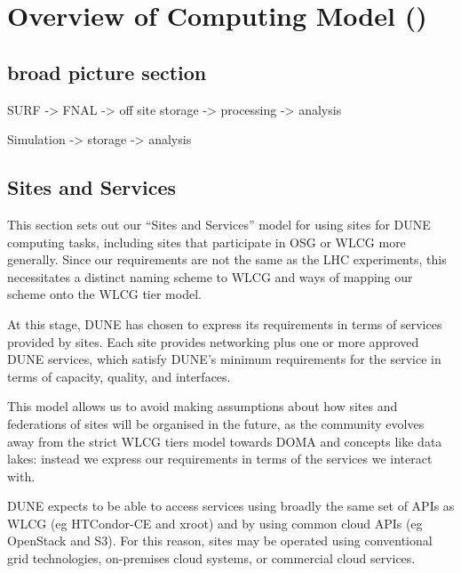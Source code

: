 \chapter{Overview of Computing Model ()}
\label{ch:cm}

\section{broad picture section}

SURF -> FNAL -> off site storage -> processing -> analysis

Simulation -> storage -> analysis



\section{Sites and Services}
\label{sec:cm:sites_and_services}  %


This section sets out our ``Sites and Services'' model for using sites for DUNE computing tasks, including sites that participate in OSG or WLCG more generally. Since our requirements are not the same as the LHC experiments, this necessitates a distinct naming scheme to WLCG and ways of mapping our scheme onto the WLCG tier model.

At this stage, DUNE has chosen to express its requirements in terms of services provided by sites. Each site provides networking plus one or more approved DUNE services, which satisfy DUNE's minimum requirements for the service in terms of capacity, quality, and interfaces.

This model allows us to avoid making assumptions about how sites and federations of sites will be organised in the future, as the community evolves away from the strict WLCG tiers model towards DOMA and concepts like data lakes: instead we express our requirements in terms of the services we interact with.

DUNE expects to be able to access services using broadly the same set of APIs as WLCG (eg HTCondor-CE and xroot) and by using common cloud APIs (eg OpenStack and S3). For this reason, sites may be operated using conventional grid technologies, on-premises cloud systems, or commercial cloud services.


